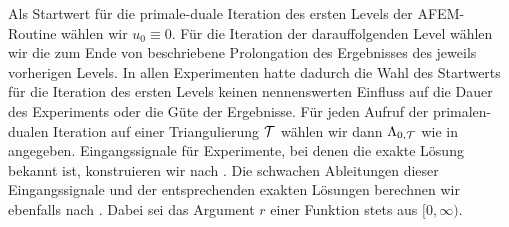 Als Startwert für die primale-duale Iteration des ersten Levels der
AFEM-Routine wählen wir $u_0\equiv 0$. 
Für die Iteration der darauffolgenden Level wählen wir die zum Ende von
 beschriebene Prolongation des Ergebnisses des
jeweils vorherigen Levels.
In allen Experimenten hatte dadurch die Wahl des Startwerts für die Iteration
des ersten Levels keinen nennenswerten Einfluss auf die Dauer des Experiments
oder die Güte der Ergebnisse. 
Für jeden Aufruf der primalen-dualen Iteration auf einer Triangulierung $\mathcal{T}$
wählen wir dann $\Lambda_{0,\mathcal{T}}$ wie in
 angegeben.
Eingangssignale für Experimente, bei denen die exakte
Lösung bekannt ist, konstruieren wir nach .
Die schwachen Ableitungen dieser Eingangssignale und der entsprechenden exakten
Lösungen berechnen wir ebenfalls nach .
Dabei sei das Argument $r$ einer Funktion stets aus $[0,\infty)$.

